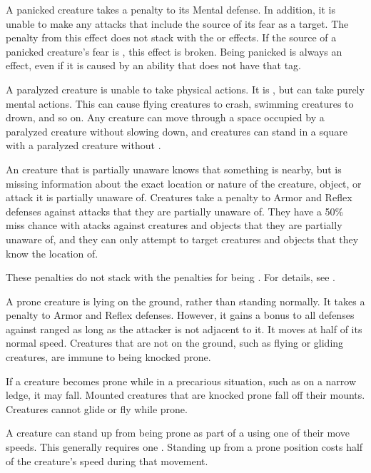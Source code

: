    A panicked creature takes a  penalty to its Mental defense.
  In addition, it is unable to make any attacks that include the source of its fear as a target.
  The penalty from this effect does not stack with the \frightened or \panicked effects.
  If the source of a panicked creature's fear is , this effect is broken.
  Being panicked is always an  effect, even if it is caused by an ability that does not have that tag.

   A paralyzed creature is unable to take physical actions. It is \helpless, but can take purely mental actions. This can cause flying creatures to crash, swimming creatures to drown, and so on. Any creature can move through a space occupied by a paralyzed creature without slowing down, and creatures can stand in a square with a paralyzed creature without \squeezing.

   An creature that is partially unaware knows that something is nearby, but is missing information about the exact location or nature of the creature, object, or attack it is partially unaware of.
  Creatures take a  penalty to Armor and Reflex defenses against attacks that they are partially unaware of.
  They have a 50\% miss chance with  atacks against creatures and objects that they are partially unaware of, and they can only attempt to target creatures and objects that they know the location of.

  These penalties do not stack with the penalties for being \unaware.
  For details, see .

   A prone creature is lying on the ground, rather than standing normally.
  It takes a  penalty to Armor and Reflex defenses.
  However, it gains a  bonus to all defenses against ranged  as long as the attacker is not adjacent to it.
  It moves at half of its normal speed.
  Creatures that are not on the ground, such as flying or gliding creatures, are immune to being knocked prone.

  If a creature becomes prone while in a precarious situation, such as on a narrow ledge, it may fall.
  Mounted creatures that are knocked prone fall off their mounts.
  Creatures cannot glide or fly while prone.

  A creature can stand up from being prone as part of a  using one of their move speeds.
  This generally requires one .
  Standing up from a prone position costs half of the creature's speed during that movement.


